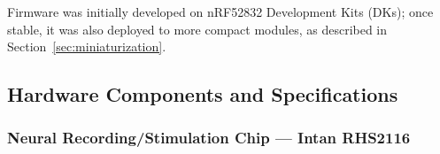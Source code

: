 Firmware was initially developed on nRF52832 Development Kits (DKs); once stable,
it was also deployed to more compact modules, as described in
Section~\ref{sec:miniaturization}.

\subsection{Hardware Components and Specifications}

\subsubsection{Neural Recording/Stimulation Chip --- Intan RHS2116}
\label{sec:hardware_intan}

